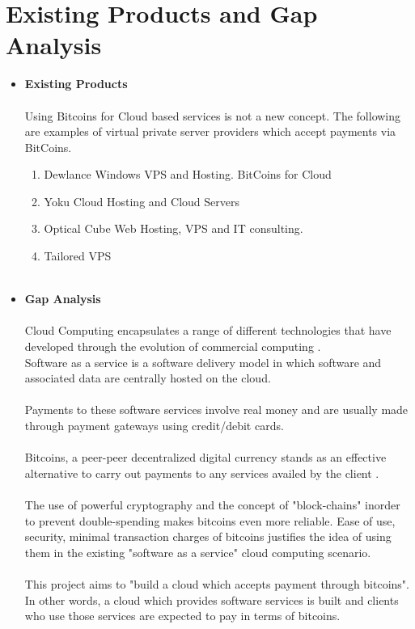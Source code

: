 \documentclass[a4page,12pt]{article}
\begin{document}
\section{Existing Products and Gap Analysis}
\vspace{0.3 in}
\begin{itemize}
\item \textbf{Existing Products}\\\\
Using Bitcoins for Cloud based services is not a new concept. The following are examples of virtual private server providers which accept payments via BitCoins.
\begin{enumerate}
\item Dewlance Windows VPS and Hosting. BitCoins for Cloud
\item Yoku Cloud Hosting and Cloud Servers 
\item Optical Cube Web Hosting, VPS and IT consulting. 
\item Tailored VPS \\\\
\end{enumerate}
\item \textbf{Gap Analysis}
\\\\
Cloud Computing encapsulates a range of different technologies that have developed through the evolution of commercial computing \cite{gapCloud}.\\
Software as a service is a software delivery model in which software and associated data are centrally hosted on the cloud\cite{saas}.\\\\
Payments to these software services involve real money and are usually made through payment gateways using credit/debit cards.\\\\
Bitcoins, a peer-peer decentralized digital currency stands as an effective alternative to carry out payments to any services availed by the client .\\\\
The use of powerful cryptography and the concept of "block-chains" inorder to prevent double-spending makes bitcoins even more reliable. Ease of use, security, minimal transaction charges of bitcoins justifies the idea of using them in the existing "software as a service" cloud computing scenario.\\\\
This project aims to "build a cloud which accepts payment through bitcoins". In other words, a cloud which provides software services is built and clients who use those services are expected to pay in terms of bitcoins.\\
\end{itemize}
\end{document}
